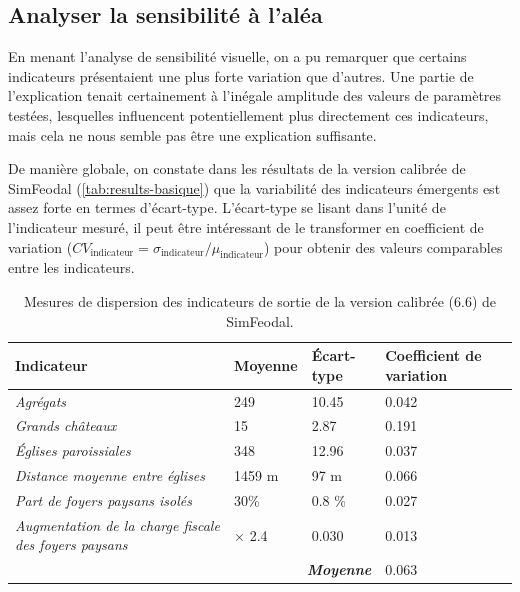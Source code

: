 \subsection{Analyser la sensibilité à l'aléa \label{subsec:sensibilite-alea}}

En menant l'analyse de sensibilité visuelle, on a pu remarquer que certains indicateurs présentaient une plus forte variation que d'autres.
Une partie de l'explication tenait certainement à l'inégale amplitude des valeurs de paramètres testées, lesquelles influencent potentiellement plus directement ces indicateurs, mais cela ne nous semble pas être une explication suffisante.

De manière globale, on constate dans les résultats de la version calibrée de SimFeodal (\cref{tab:results-basique}) que la variabilité des indicateurs émergents est assez forte en termes d'écart-type.
L'écart-type se lisant dans l'unité de l'indicateur mesuré, il peut être intéressant de le transformer en coefficient de variation ($CV_{\text{indicateur}} = \sigma_{\text{indicateur}}  /  \mu_{\text{indicateur}}$) pour obtenir des valeurs comparables entre les indicateurs. 


\begin{table}[H]
{\renewcommand{\arraystretch}{1.1}%
	\begin{tabular}{|p{5cm}|p{2.5cm}|p{2.5cm}|p{2.5cm}|}
\hline
\textbf{Indicateur} & \textbf{Moyenne} & \textbf{Écart-type} & \textbf{Coefficient de variation} \\
\hline
\textit{Agrégats} & 249 & 10.45 & 0.042\\
\hline
\textit{Grands châteaux} & 15 & 2.87 & 0.191\\
\hline
\textit{Églises paroissiales} & 348 & 12.96 & 0.037\\
\hline
\textit{Distance moyenne entre églises} & 1459 m & 97 m & 0.066\\
\hline
\textit{Part de foyers paysans isolés} & 30\% & 0.8 \% & 0.027\\
\hline
\textit{Augmentation de la charge fiscale des foyers paysans} & $\times$ 2.4 & 0.030 & 0.013\\
\hline
\multicolumn{3}{r|}{\textbf{\textit{Moyenne}}} & 0.063\\
\cline{4-4}
	\end{tabular}
}
\caption{Mesures de dispersion des indicateurs de sortie de la version calibrée (6.6) de SimFeodal.}
\label{tab:variabilite-indicateurs}
\end{table}

